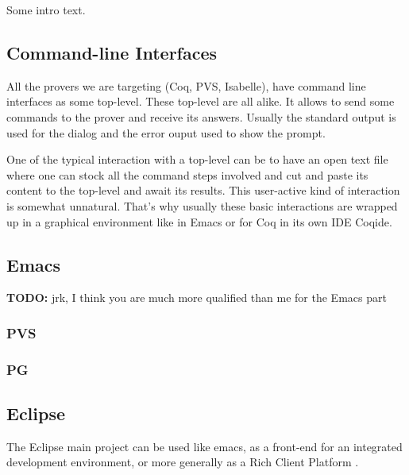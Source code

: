 \documentclass{entcs}
\newcommand{\todo}{\textbf{TODO: }}
\begin{document}
Some intro text.

\subsection{Command-line Interfaces}
\label{subsec:comm-line-interf}

All the provers we are targeting (Coq, PVS, Isabelle), have command line interfaces as 
some top-level. These top-level are all alike. It allows to send some commands
to the prover and receive its answers. Usually the standard output is
used for the dialog and the error ouput used to show the prompt.

One of the typical interaction with a top-level can be to have an open text file
where one can stock all the command steps involved and cut and paste its 
content to the top-level and await its results. This user-active kind of 
interaction is somewhat unnatural. That's why usually these basic interactions
are wrapped up in a graphical environment like in Emacs or for Coq
in its own IDE Coqide.

\subsection{Emacs}
\label{subsec:emacs}

\todo{jrk, I think you are much more qualified than me for the Emacs part}

\subsubsection{PVS }

\subsubsection{PG}

\subsection{Eclipse}
\label{subsec:eclipse}

The Eclipse main project can be used like emacs, as a front-end 
for an integrated development environment, or more generally as
a Rich Client Platform \cite{eclipse-rcp}. 
\end{document}
